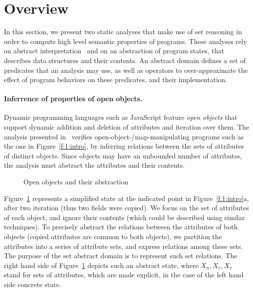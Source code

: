 \section{Overview}
\label{s:2:over}
In this section, we present two static analyses that make use of set
reasoning in order to compute high level semantic properties of
programs.
These analyses rely on abstract interpretation~\cite{cc:popl:77} and
on an abstraction of program states, that describes data structures
and their contents.
An abstract domain defines a set of predicates that an analysis may
use, as well as operators to over-approximate the effect of program
behaviors on these predicates, and their implementation.

\paragraph{Inferrence of properties of open objects.}
Dynamic programming languages such as JavaScript feature {\em open objects}
that support dynamic addition and deletion of attributes and iteration over
them.
The analysis presented in~\cite{hoo:14:sas} verifies open-object-/map-manipulating programs such as the one in Figure~\ref{f:1:intro}, by
inferring relations between the sets of attributes
of distinct objects.
Since objects may have an unbounded number of attributes, the analysis must 
abstract the attributes and their contents.
\newcommand{\varsrc}{\cvar{src}}
\newcommand{\vardst}{\cvar{dst}}
\begin{figure}[t]
  \newcommand{\picscale}{0.82}
  \centering
    \tikzpics{\picscale}{hoo-inv}
  \caption{Open objects and their abstraction}
  \label{f:2:hoo}
\end{figure}
Figure~\ref{f:2:hoo} represents a simplified state at the indicated point in Figure~\ref{f:1:intro}a,
after two iteration (thus two fields were copied).
We focus on the set of attributes of each object, and ignore their
contents (which could be described using similar techniques).
To precisely abstract the relations between the attributes of both objects
(\eg copied attributes are common to both objects), we partition the attributes into a series of attribute sets,
 and express relations among these sets.
The purpose of the set abstract domain is to represent such set
relations.
The right hand side of Figure~\ref{f:2:hoo} depicts such an abstract
state, where \( X_n, X_r, X_v \) stand for sets of attributes, which are
made explicit, in the case of the left hand side concrete state.

